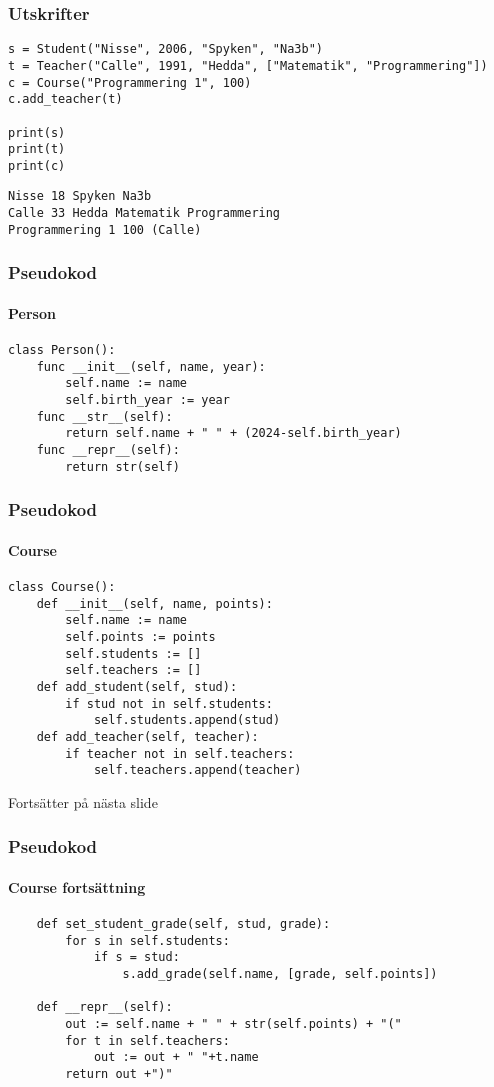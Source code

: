 \documentclass[aspectratio=169]{beamer}
\begin{document}
\begin{frame}[fragile]
	\frametitle{Utskrifter}
	
	\begin{lstlisting}
s = Student("Nisse", 2006, "Spyken", "Na3b")
t = Teacher("Calle", 1991, "Hedda", ["Matematik", "Programmering"])
c = Course("Programmering 1", 100)
c.add_teacher(t)

print(s)
print(t)
print(c)
	\end{lstlisting}
	\begin{lstlisting}
Nisse 18 Spyken Na3b
Calle 33 Hedda Matematik Programmering
Programmering 1 100 (Calle)
	\end{lstlisting}
	
\end{frame}

\begin{frame}[fragile]
	\frametitle{Pseudokod}
	\framesubtitle{Person}
	
	\begin{lstlisting}
class Person():
    func __init__(self, name, year):
        self.name := name
        self.birth_year := year
    func __str__(self):
        return self.name + " " + (2024-self.birth_year)
    func __repr__(self):
        return str(self)
	\end{lstlisting}

\end{frame}

\begin{frame}[fragile]
	\frametitle{Pseudokod}
	\framesubtitle{Course}
	
	\begin{lstlisting}
class Course():
	def __init__(self, name, points):
        self.name := name
        self.points := points
        self.students := []
        self.teachers := []
    def add_student(self, stud):
        if stud not in self.students:
            self.students.append(stud)
    def add_teacher(self, teacher):
        if teacher not in self.teachers:
            self.teachers.append(teacher)
	\end{lstlisting}
	
	Fortsätter på nästa slide

\end{frame}

\begin{frame}[fragile]
	\frametitle{Pseudokod}
	\framesubtitle{Course fortsättning}
	
	\begin{lstlisting}
    def set_student_grade(self, stud, grade):
        for s in self.students:
            if s = stud:
                s.add_grade(self.name, [grade, self.points])

    def __repr__(self):
        out := self.name + " " + str(self.points) + "("
        for t in self.teachers:
            out := out + " "+t.name
        return out +")"
	\end{lstlisting}
\end{frame}
\end{document}
